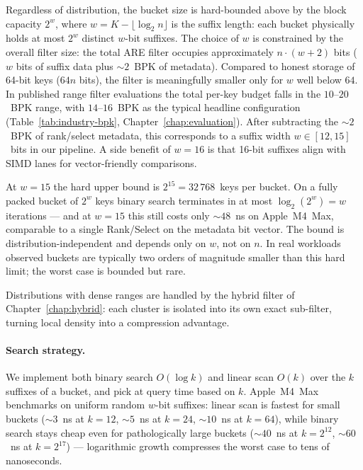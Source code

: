 Regardless of distribution, the bucket size is hard-bounded above by
the block capacity $2^w$, where $w = K - \lfloor \log_2 n \rfloor$ is
the suffix length: each bucket physically holds at most $2^w$ distinct
$w$-bit suffixes.
The choice of $w$ is constrained by the overall
filter size: the total ARE filter occupies approximately
$n \cdot (w + 2)$ bits ($w$ bits of suffix data plus ${\sim}2$~BPK of
metadata).
Compared to honest storage of 64-bit keys ($64 n$ bits),
the filter is meaningfully smaller only for $w$ well below $64$.
In published range filter evaluations the total per-key budget falls
in the $10$--$20$~BPK range, with $14$--$16$~BPK as the typical
headline configuration (Table~\ref{tab:industry-bpk},
Chapter~\ref{chap:evaluation}).
After subtracting the ${\sim}2$~BPK of rank/select metadata, this
corresponds to a suffix width $w \in [12, 15]$~bits in our pipeline.
A side benefit of $w = 16$ is that 16-bit suffixes align with SIMD
lanes for vector-friendly comparisons.

At $w = 15$ the hard upper bound is $2^{15} = 32\,768$~keys per bucket.
On a fully packed bucket of $2^w$ keys binary search terminates in at most
$\log_2(2^w) = w$ iterations --- and at $w = 15$ this still costs only
${\sim}48$~ns on Apple~M4~Max, comparable to a single Rank/Select on the metadata bit
vector.
The bound is distribution-independent and depends only on $w$,
not on $n$.
In real workloads observed buckets are typically two orders of
magnitude smaller than this hard limit; the worst case is bounded
but rare.

Distributions with dense ranges are handled by the hybrid filter of
Chapter~\ref{chap:hybrid}: each cluster is isolated into its own exact
sub-filter, turning local density into a compression advantage.

\paragraph{Search strategy.}
We implement both binary search $O(\log k)$ and linear scan $O(k)$ over
the $k$ suffixes of a bucket, and pick at query time based on $k$.
Apple~M4~Max benchmarks on uniform random $w$-bit suffixes:
linear scan is fastest for small buckets (${\sim}3$~ns at $k = 12$,
${\sim}5$~ns at $k = 24$, ${\sim}10$~ns at $k = 64$), while binary search
stays cheap even for pathologically large buckets (${\sim}40$~ns at
$k = 2^{12}$, ${\sim}60$~ns at $k = 2^{17}$) --- logarithmic growth
compresses the worst case to tens of nanoseconds.

